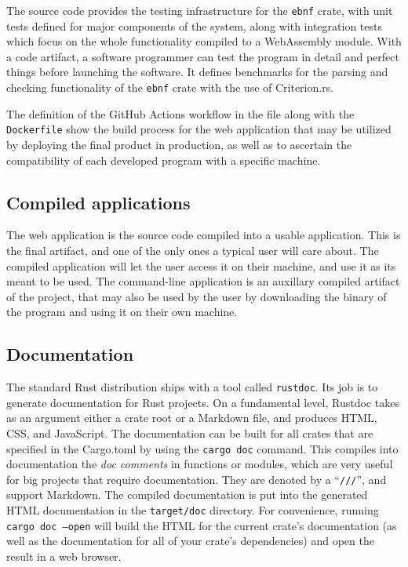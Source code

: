 \documentclass[english,bachelors,forcepolishlogotype]{wizthesis}
\begin{document}
The source code provides the testing infrastructure for the \texttt{ebnf} crate,
with unit tests defined for major components of the system, along with
integration tests which focus on the whole functionality compiled to a
WebAssembly module. With a code artifact, a software programmer can test the
program in detail and perfect things before launching the software. It defines
benchmarks for the parsing and checking functionality of the \texttt{ebnf} crate
with the use of Criterion.rs.

The definition of the GitHub Actions workflow in the  file along
with the \texttt{Dockerfile} show the build process for the web application that
may be utilized by deploying the final product in production, as well as to
ascertain the compatibility of each developed program with a specific machine.

\subsection*{Compiled applications}

The web application is the source code compiled into a usable application. This
is the final artifact, and one of the only ones a typical user will care about.
The compiled application will let the user access it on their machine, and use
it as its meant to be used. The command-line application is an auxillary
compiled artifact of the project, that may also be used by the user by
downloading the binary of the program and using it on their own machine.

\subsection*{Documentation}

The standard Rust distribution ships with a tool called \texttt{rustdoc}. Its
job is to generate documentation for Rust projects. On a fundamental level,
Rustdoc takes as an argument either a crate root or a Markdown file, and
produces HTML, CSS, and JavaScript. The documentation can be built for all
crates that are specified in the Cargo.toml by using the \texttt{cargo doc}
command. This compiles into documentation the \emph{doc comments} in functions
or modules, which are very useful for big projects that require documentation.
They are denoted by a ``\texttt{///}'', and support Markdown. The compiled documentation
is put into the generated HTML documentation in the \texttt{target/doc}
directory. For convenience, running \texttt{cargo doc --open} will build the
HTML for the current crate's documentation (as well as the documentation for
all of your crate's dependencies) and open the result in a web browser.
\end{document}
